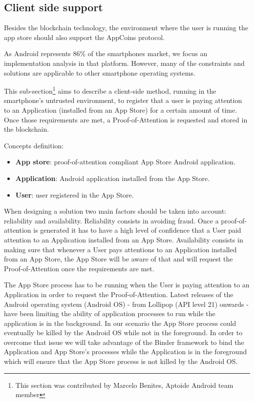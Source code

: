 \subsection{Client side support}

Besides the blockchain technology, the environment where the user is running the app store should also support the AppCoins protocol.


As Android represents 86\% of the smartphones market, we focus an implementation analysis in that platform. However, many of the constraints and solutions are applicable to other smartphone operating systems.

This sub-section\footnote{This section was contributed by Marcelo Benites, Aptoide Android team member} aims to describe a client-side method, running in the smartphone's untrusted environment, to register that a user is paying attention to an Application (installed from an App Store) for a certain amount of time. Once those requirements are met, a Proof-of-Attention is requested and stored in the blockchain.
 
 
Concepts definition: %
\begin{itemize}
\item {\bf App store}: proof-of-attention compliant App Store Android application.
\item {\bf Application}: Android application installed from the App Store.
\item {\bf User}: user registered in the App Store.
\end{itemize}

When designing a solution two main factors should be taken into account: reliability and availability. Reliability consists in avoiding fraud. Once a proof-of-attention %
 is generated it has to have a high level of confidence that a User paid attention to an Application installed from an App Store. Availability consists in making sure that whenever a User pays attentions to an Application installed from an App Store, the App Store will be aware of that and will request the Proof-of-Attention once the requirements are met. %

The App Store process has to be running when the User is paying attention to an Application %
 in order to request  the Proof-of-Attention. Latest releases of the Android operating system (Android OS) - from Lollipop (API level 21) onwards - have been limiting the ability of application processes to run while the application is in the background. In our scenario the App Store process could eventually be killed by the Android OS while not in the foreground. In order to overcome that issue we will take advantage of the Binder framework to bind the Application and App Store's processes while the Application is in the foreground which will ensure that the App Store process is not killed by the Android OS. 

